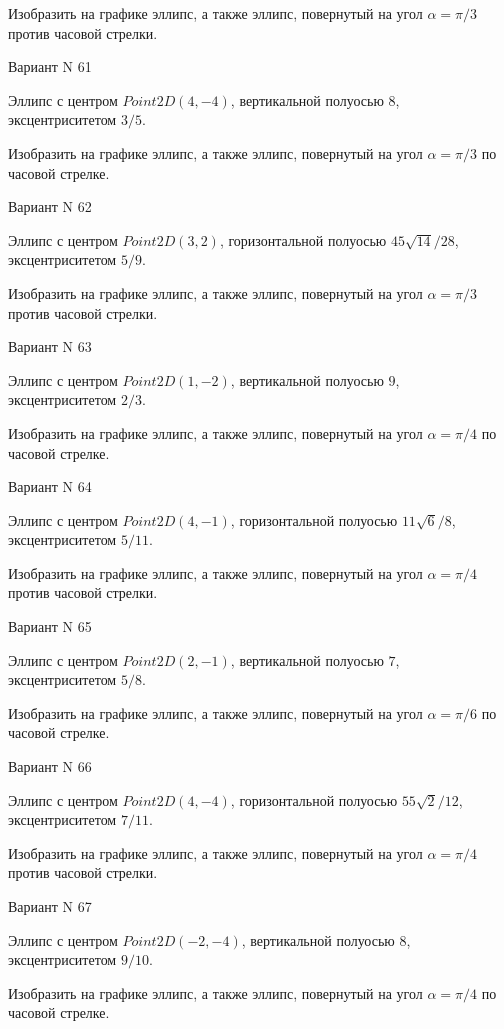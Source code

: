 \documentclass[11pt]{report}
\begin{document}
    Изобразить на графике эллипс, а также эллипс, повернутый на угол $\alpha = $$\pi / 3$ против часовой стрелки.

Вариант N 61

Эллипс с центром $Point2D\left(4, -4\right)$, вертикальной полуосью $8$, эксцентриситетом $3 / 5$.

    Изобразить на графике эллипс, а также эллипс, повернутый на угол $\alpha = $$\pi / 3$ по часовой стрелке.

Вариант N 62

Эллипс с центром $Point2D\left(3, 2\right)$, горизонтальной полуосью $45 \sqrt{14} / 28$, эксцентриситетом $5 / 9$.

    Изобразить на графике эллипс, а также эллипс, повернутый на угол $\alpha = $$\pi / 3$ против часовой стрелки.

Вариант N 63

Эллипс с центром $Point2D\left(1, -2\right)$, вертикальной полуосью $9$, эксцентриситетом $2 / 3$.

    Изобразить на графике эллипс, а также эллипс, повернутый на угол $\alpha = $$\pi / 4$ по часовой стрелке.

Вариант N 64

Эллипс с центром $Point2D\left(4, -1\right)$, горизонтальной полуосью $11 \sqrt{6} / 8$, эксцентриситетом $5 / 11$.

    Изобразить на графике эллипс, а также эллипс, повернутый на угол $\alpha = $$\pi / 4$ против часовой стрелки.

Вариант N 65

Эллипс с центром $Point2D\left(2, -1\right)$, вертикальной полуосью $7$, эксцентриситетом $5 / 8$.

    Изобразить на графике эллипс, а также эллипс, повернутый на угол $\alpha = $$\pi / 6$ по часовой стрелке.

Вариант N 66

Эллипс с центром $Point2D\left(4, -4\right)$, горизонтальной полуосью $55 \sqrt{2} / 12$, эксцентриситетом $7 / 11$.

    Изобразить на графике эллипс, а также эллипс, повернутый на угол $\alpha = $$\pi / 4$ против часовой стрелки.

Вариант N 67

Эллипс с центром $Point2D\left(-2, -4\right)$, вертикальной полуосью $8$, эксцентриситетом $9 / 10$.

    Изобразить на графике эллипс, а также эллипс, повернутый на угол $\alpha = $$\pi / 4$ по часовой стрелке.
\end{document}
